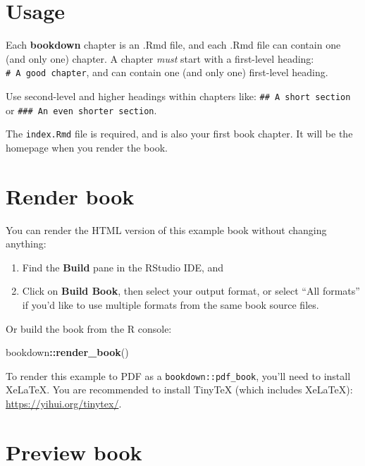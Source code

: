 \documentclass[
]{book}
\newenvironment{Shaded}{\begin{snugshade}}{\end{snugshade}}
\newcommand{\FunctionTok}[1]{\textcolor[rgb]{0.13,0.29,0.53}{\textbf{#1}}}
\newcommand{\NormalTok}[1]{#1}
\newcommand{\SpecialCharTok}[1]{\textcolor[rgb]{0.81,0.36,0.00}{\textbf{#1}}}
\begin{document}
\hypertarget{usage}{%
\section{Usage}\label{usage}}

Each \textbf{bookdown} chapter is an .Rmd file, and each .Rmd file can contain one (and only one) chapter. A chapter \emph{must} start with a first-level heading: \texttt{\#\ A\ good\ chapter}, and can contain one (and only one) first-level heading.

Use second-level and higher headings within chapters like: \texttt{\#\#\ A\ short\ section} or \texttt{\#\#\#\ An\ even\ shorter\ section}.

The \texttt{index.Rmd} file is required, and is also your first book chapter. It will be the homepage when you render the book.

\hypertarget{render-book}{%
\section{Render book}\label{render-book}}

You can render the HTML version of this example book without changing anything:

\begin{enumerate}
\def\labelenumi{\arabic{enumi}.}
\item
  Find the \textbf{Build} pane in the RStudio IDE, and
\item
  Click on \textbf{Build Book}, then select your output format, or select ``All formats'' if you'd like to use multiple formats from the same book source files.
\end{enumerate}

Or build the book from the R console:

\begin{Shaded}
\begin{Highlighting}[]
\NormalTok{bookdown}\SpecialCharTok{::}\FunctionTok{render\_book}\NormalTok{()}
\end{Highlighting}
\end{Shaded}

To render this example to PDF as a \texttt{bookdown::pdf\_book}, you'll need to install XeLaTeX. You are recommended to install TinyTeX (which includes XeLaTeX): \url{https://yihui.org/tinytex/}.

\hypertarget{preview-book}{%
\section{Preview book}\label{preview-book}}
\end{document}
